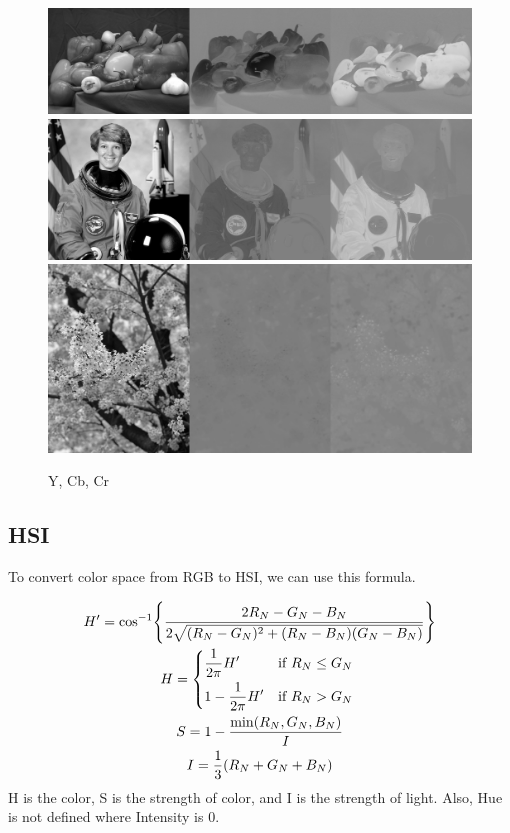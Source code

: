 \documentclass{article}
\begin{document}
\begin{figure}[h]
    \centering
    \includegraphics[width=.4\textwidth]{fig/YCbCr_peppers.png}\\
    \includegraphics[width=.4\textwidth]{fig/YCbCr_astronaut.png}\\
    \includegraphics[width=.4\textwidth]{fig/YCbCr_cb.png}
    \caption{Y, Cb, Cr}
\end{figure}


\newpage
\subsection{HSI}
To convert color space from RGB to HSI, we can use this formula.

\begin{gather*}
    H' = \cos^{-1} \Biggl \{ \frac{2R_N - G_N - B_N}{2\sqrt{(R_N-G_N)^2 + (R_N-B_N)(G_N-B_N)}} \Biggl \} \\
    H = 
    \begin{dcases*}
    \frac{1}{2\pi}H' & if $R_N \leq G_N$ \\
    1 - \frac{1}{2\pi}H' & if $R_N > G_N$
    \end{dcases*} 
    \\
    S = 1 - \frac{\min(R_N,G_N,B_N)}{I}  \\
    I = \frac{1}{3} (R_N + G_N + B_N)
\end{gather*}
H is the color, S is the strength of color, and I is the strength of light.   
Also, Hue is not defined where Intensity is 0.
\end{document}
